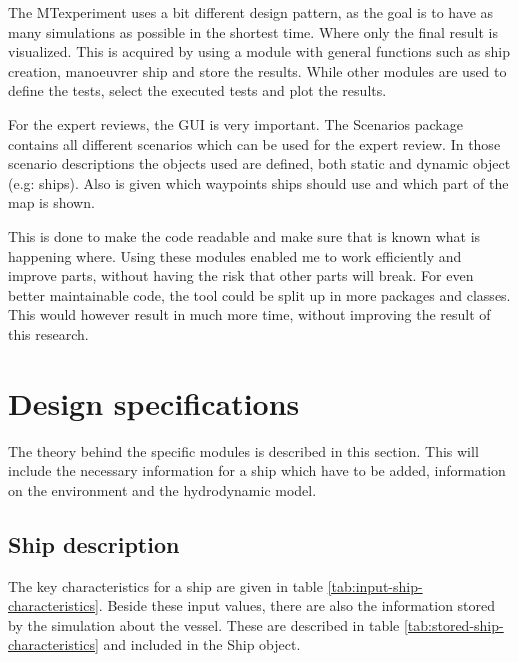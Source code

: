 The MTexperiment uses a bit different design pattern, as the goal is to have as many simulations as possible in the shortest time. Where only the final result is visualized. This is acquired by using a module with general functions such as ship creation, manoeuvrer ship and store the results. While other modules are used to define the tests, select the executed tests and plot the results. 

For the expert reviews, the GUI is very important. The Scenarios package contains all different scenarios which can be used for the expert review. In those scenario descriptions the objects used are defined, both static and dynamic object (e.g: ships). Also is given which waypoints ships should use and which part of the map is shown.

This is done to make the code readable and make sure that is known what is happening where. Using these modules enabled me to work efficiently and improve parts, without having the risk that other parts will break. For even better maintainable code, the tool could be split up in more packages and classes. This would however result in much more time, without improving the result of this research.

\section{Design specifications}
The theory behind the specific modules is described in this section. This will include the necessary information for a ship which have to be added, information on the environment and the hydrodynamic model.

\subsection{Ship description}
The key characteristics for a ship are given in table \ref{tab:input-ship-characteristics}. Beside these input values, there are also the information stored by the simulation about the vessel. These are described in table \ref{tab:stored-ship-characteristics} and included in the Ship object.

